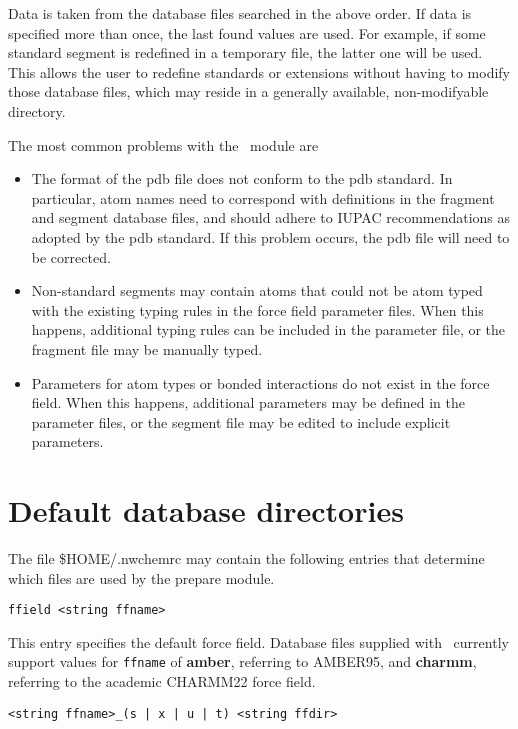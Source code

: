Data is taken from the database files searched in the above order. If data
is specified more than once, the last found values are used. For example,
if some standard segment is redefined in a temporary file, the latter one
will be used. This allows the user to redefine standards or extensions 
without having to modify those database files, which may reside in a
generally available, non-modifyable directory.
\par
The most common problems with the \prepare\ module are
\begin{itemize}
\item[{\bf ~}]
The format of the pdb file does not conform to the pdb standard. In
particular, atom names need to correspond with definitions in the
fragment and segment database files, and should adhere to IUPAC
recommendations as adopted by the pdb standard. If this problem
occurs, the pdb file will need to be corrected.
\item[{\bf ~}]
Non-standard segments may contain atoms that could not be atom typed
with the existing typing rules in the force field parameter files.
When this happens, additional typing rules can be included in the
parameter file, or the fragment file may be manually typed.
\item[{\bf ~}]
Parameters for atom types or bonded interactions do not exist in
the force field. When this happens, additional parameters may be
defined in the parameter files, or the segment file may be edited
to include explicit parameters.
\end{itemize}

\section{Default database directories}

The file \$HOME/.nwchemrc may contain the following entries that determine
which files are used by the prepare module.

\begin{verbatim}
ffield <string ffname>
\end{verbatim}

This entry specifies the default force field. Database files supplied with
\nwchem\ currently support values for \verb+ffname+ of {\bf amber}, referring 
to AMBER95, and {\bf charmm}, referring to the academic CHARMM22 force field.

\begin{verbatim}
<string ffname>_(s | x | u | t) <string ffdir>
\end{verbatim}

